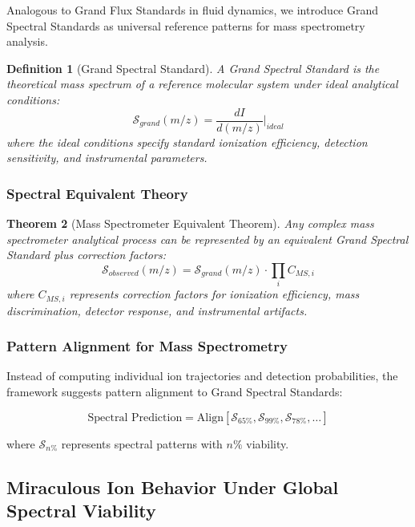 \documentclass[11pt,a4paper]{article}
\newtheorem{theorem}{Theorem}[section]
\newtheorem{definition}[theorem]{Definition}
\theoremstyle{remark}
\begin{document}
Analogous to Grand Flux Standards in fluid dynamics, we introduce Grand Spectral Standards as universal reference patterns for mass spectrometry analysis.

\begin{definition}[Grand Spectral Standard]
A Grand Spectral Standard is the theoretical mass spectrum of a reference molecular system under ideal analytical conditions:
\begin{equation}
\mathcal{S}_{grand}(m/z) = \frac{dI}{d(m/z)}\bigg|_{ideal}
\end{equation}
where the ideal conditions specify standard ionization efficiency, detection sensitivity, and instrumental parameters.
\end{definition}

\subsubsection{Spectral Equivalent Theory}

\begin{theorem}[Mass Spectrometer Equivalent Theorem]
Any complex mass spectrometer analytical process can be represented by an equivalent Grand Spectral Standard plus correction factors:
\begin{equation}
\mathcal{S}_{observed}(m/z) = \mathcal{S}_{grand}(m/z) \cdot \prod_{i} C_{MS,i}
\end{equation}
where $C_{MS,i}$ represents correction factors for ionization efficiency, mass discrimination, detector response, and instrumental artifacts.
\end{theorem}

\subsubsection{Pattern Alignment for Mass Spectrometry}

Instead of computing individual ion trajectories and detection probabilities, the framework suggests pattern alignment to Grand Spectral Standards:

\begin{equation}
\text{Spectral Prediction} = \text{Align}[\mathcal{S}_{65\%}, \mathcal{S}_{99\%}, \mathcal{S}_{78\%}, \ldots]
\end{equation}

where $\mathcal{S}_{n\%}$ represents spectral patterns with $n\%$ viability.

\subsection{Miraculous Ion Behavior Under Global Spectral Viability}
\end{document}
